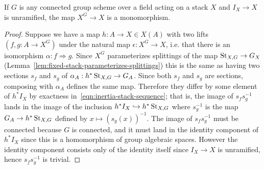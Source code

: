 \begin{proposition}\label{rl-000L}\label{prop:condition-for-monomorphism}
  If $G$ is any connected group scheme over a field acting on a stack $X$ and \(I_X\to X\) is unramified, the map $X^{G}\to X$ is a monomorphism.
\end{proposition}
\begin{proof}
  Suppose we have a map $h:A\to X\in X(A)$ with two lifts $(f,g:A\to X^{G})$ under the natural map $\epsilon:X^{G}\to X$, i.e. that there is an isomorphism $\alpha:f\Rightarrow g$. Since $X^{G}$ parameterizes splittings of the map $\operatorname{St}_{X,G}\to G_X$ (Lemma~\ref{lem:fixed-stack-parameterizes-splittings}) this is the same as having two sections $s_f$ and $s_g$ of $\alpha_A:h^*\operatorname{St}_{X,G}\to G_A$. Since both \(s_f\) and \(s_g\) are sections, composing with \(\alpha_A\) defines the same map. Therefore they differ by some element of \(h^*I_X\) by exactness in~\eqref{eqn:inertia-stack-sequence}; that is, the image of $s_fs^{-1}_g$ lands in the image of the inclusion $h^*I_X\hookrightarrow h^*\operatorname{St}_{X,G}$ where $s_g^{-1}$ is the map $G_A\to h^*\operatorname{St}_{X,G}$ defined by $x\mapsto (s_g(x))^{-1}$. The image of \(s_fs^{-1}_g\) must be connected because \(G\) is connected, and it must land in the identity component of \(h^*I_X\) since this is a homomorphism of group algebraic spaces. However the identity component consists only of the identity itself since \(I_X \to X\) is unramified, hence \(s_fs^{-1}_g\) is trivial.
\end{proof}
